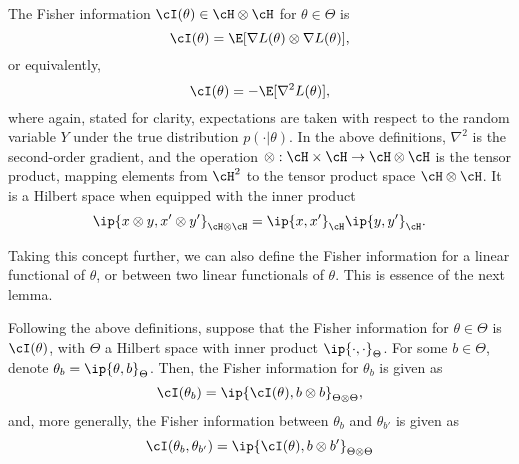 The Fisher information $\cI(\theta) \in \mathcal \cH \otimes \mathcal \cH$ for $\theta \in \Theta$ is
\[
	\cI(\theta) = \E[\nabla L(\theta) \otimes \nabla L(\theta)],
\]
or equivalently,
\[
	\cI(\theta) = -\E[\nabla^2 L(\theta)],
\]
where again, stated for clarity, expectations are taken with respect to the random variable $Y$ under the true distribution $p(\cdot|\theta)$.
In the above definitions, $\nabla^2$ is the second-order gradient, and the operation $\otimes:\cH \times \cH \to \cH \otimes \cH$ is the tensor product, mapping elements from $\cH^2$ to the tensor product space $\cH \otimes \cH$.
It is a Hilbert space when equipped with the inner product
\[
  \ip{x\otimes y, x'\otimes y'}_{\cH\otimes\cH} = \ip{x, x'}_\cH\ip{y, y'}_\cH.
\]

Taking this concept further, we can also define the Fisher information for a linear functional of $\theta$, or between two linear functionals of $\theta$.
This is essence of the next lemma.

\begin{lemma}\label{thm:fisherlinfunc}
	Following the above definitions, suppose that the Fisher information for $\theta \in \Theta$ is $\cI(\theta)$, with $\Theta$ a Hilbert space with inner product $\ip{\cdot,\cdot}_\Theta$.
	For some $b\in\Theta$, denote $\theta_b = \ip{\theta,b}_\Theta$.
	Then, the Fisher information for $\theta_b$ is given as
	\[
		\cI(\theta_b) = \ip{\cI(\theta), b \otimes b}_{\Theta \otimes \Theta},
	\]
	and, more generally, the Fisher information between $\theta_b$ and $\theta_{b'}$ is given as
	\[
		\cI(\theta_b,\theta_{b'}) = \ip{\cI(\theta), b \otimes b'}_{\Theta \otimes \Theta}
	\]
\end{lemma}


